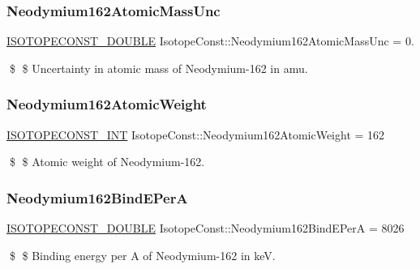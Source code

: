 \subsubsection{\texorpdfstring{Neodymium162\+Atomic\+Mass\+Unc}{Neodymium162AtomicMassUnc}}
{\footnotesize\ttfamily \mbox{\hyperlink{group___isotope_const-_macros_ga8f45a7272ce02c0b4c65c44636ed719a}{I\+S\+O\+T\+O\+P\+E\+C\+O\+N\+S\+T\+\_\+\+D\+O\+U\+B\+LE}} Isotope\+Const\+::\+Neodymium162\+Atomic\+Mass\+Unc = 0.}

\$ \$ Uncertainty in atomic mass of Neodymium-\/162 in amu. \mbox{\label{group___isotope_const-_neodymium-_nd162_ga39670bafc6f70c34c99a5419473460e0}} 
\subsubsection{\texorpdfstring{Neodymium162\+Atomic\+Weight}{Neodymium162AtomicWeight}}
{\footnotesize\ttfamily \mbox{\hyperlink{group___isotope_const-_macros_ga5f18360b3e99483a35c32d789e62621c}{I\+S\+O\+T\+O\+P\+E\+C\+O\+N\+S\+T\+\_\+\+I\+NT}} Isotope\+Const\+::\+Neodymium162\+Atomic\+Weight = 162}

\$ \$ Atomic weight of Neodymium-\/162. \mbox{\label{group___isotope_const-_neodymium-_nd162_ga71ca92c60179e03999c485fc4ebc9f46}} 
\subsubsection{\texorpdfstring{Neodymium162\+Bind\+E\+PerA}{Neodymium162BindEPerA}}
{\footnotesize\ttfamily \mbox{\hyperlink{group___isotope_const-_macros_ga8f45a7272ce02c0b4c65c44636ed719a}{I\+S\+O\+T\+O\+P\+E\+C\+O\+N\+S\+T\+\_\+\+D\+O\+U\+B\+LE}} Isotope\+Const\+::\+Neodymium162\+Bind\+E\+PerA = 8026}

\$ \$ Binding energy per A of Neodymium-\/162 in keV. \mbox{\label{group___isotope_const-_neodymium-_nd162_gad2d853b1282e4381d0ced3630250f0bf}} 
